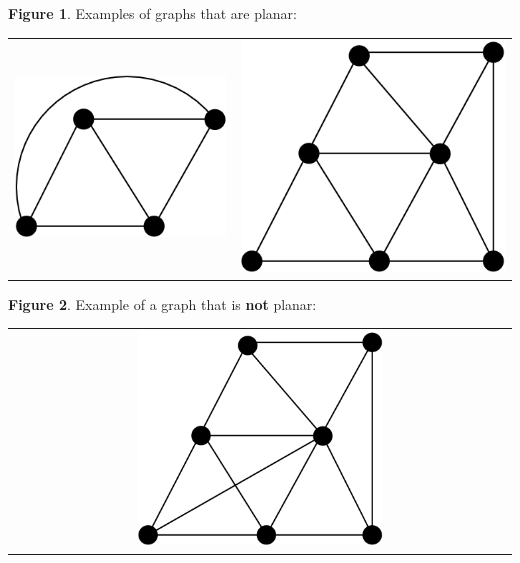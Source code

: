 \documentclass{article}
\begin{document}
\textbf{Figure 1}. Examples of graphs that are planar:
\begin{tabular}{cc}
  \includegraphics{approx-1.png}
  &
  \includegraphics{approx-2.png}
\end{tabular}

\textbf{Figure 2}. Example of a graph that is \textbf{not} planar:
\begin{tabular}{c}
  \includegraphics[width=0.5\textwidth]{approx-3.png}
\end{tabular}
\end{document}
